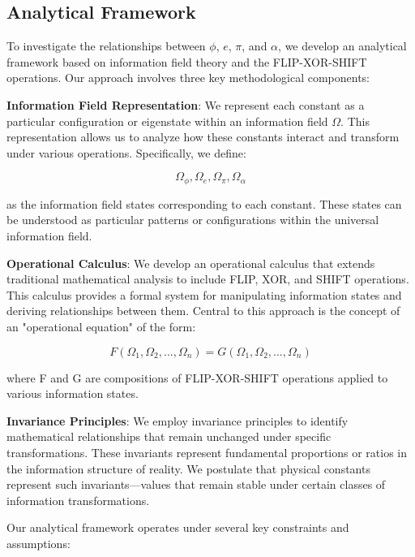 \subsection{Analytical Framework}

To investigate the relationships between $\phi$, $e$, $\pi$, and $\alpha$, we develop an analytical framework based on information field theory and the FLIP-XOR-SHIFT operations. Our approach involves three key methodological components:

\textbf{Information Field Representation}: We represent each constant as a particular configuration or eigenstate within an information field $\Omega$. This representation allows us to analyze how these constants interact and transform under various operations. Specifically, we define:

\begin{equation}
\Omega_\phi, \Omega_e, \Omega_\pi, \Omega_\alpha
\end{equation}

as the information field states corresponding to each constant. These states can be understood as particular patterns or configurations within the universal information field.

\textbf{Operational Calculus}: We develop an operational calculus that extends traditional mathematical analysis to include FLIP, XOR, and SHIFT operations. This calculus provides a formal system for manipulating information states and deriving relationships between them. Central to this approach is the concept of an "operational equation" of the form:

\begin{equation}
F(\Omega_1, \Omega_2, ..., \Omega_n) = G(\Omega_1, \Omega_2, ..., \Omega_n)
\end{equation}

where F and G are compositions of FLIP-XOR-SHIFT operations applied to various information states.

\textbf{Invariance Principles}: We employ invariance principles to identify mathematical relationships that remain unchanged under specific transformations. These invariants represent fundamental proportions or ratios in the information structure of reality. We postulate that physical constants represent such invariants—values that remain stable under certain classes of information transformations.

Our analytical framework operates under several key constraints and assumptions:

